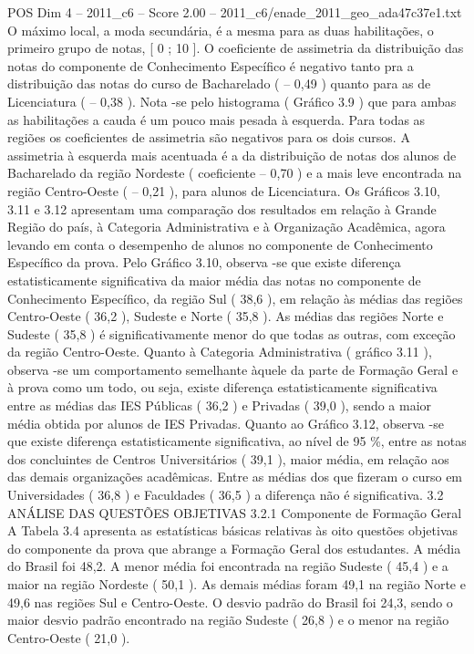 \begin{textsample}{POS Dim 4 – 2011\_c6 – Score 2.00 – 2011\_c6/enade\_2011\_geo\_ada47c37e1.txt}
O máximo local, a moda secundária, é a mesma para as duas habilitações, o primeiro grupo de notas, [ 0 ; 10 ].
O coeficiente de assimetria da distribuição das notas do componente de Conhecimento Específico é negativo tanto pra a distribuição das notas do curso de Bacharelado ( – 0,49 ) quanto para as de Licenciatura ( – 0,38 ).
Nota -se pelo histograma ( Gráfico 3.9 ) que para ambas as habilitações a cauda é um pouco mais pesada à esquerda.
Para todas as regiões os coeficientes de assimetria são negativos para os dois cursos.
A assimetria à esquerda mais acentuada é a da distribuição de notas dos alunos de Bacharelado da região Nordeste ( coeficiente – 0,70 ) e a mais leve encontrada na região Centro-Oeste ( – 0,21 ), para alunos de Licenciatura.
Os Gráficos 3.10, 3.11 e 3.12 apresentam uma comparação dos resultados em relação à Grande Região do país, à Categoria Administrativa e à Organização Acadêmica, agora levando em conta o desempenho de alunos no componente de Conhecimento Específico da prova.
Pelo Gráfico 3.10, observa -se que existe diferença estatisticamente significativa da maior média das notas no componente de Conhecimento Específico, da região Sul ( 38,6 ), em relação às médias das regiões Centro-Oeste ( 36,2 ), Sudeste e Norte ( 35,8 ).
As médias das regiões Norte e Sudeste ( 35,8 ) é significativamente menor do que todas as outras, com exceção da região Centro-Oeste.
Quanto à Categoria Administrativa ( gráfico 3.11 ), observa -se um comportamento semelhante àquele da parte de Formação Geral e à prova como um todo, ou seja, existe diferença estatisticamente significativa entre as médias das IES Públicas ( 36,2 ) e Privadas ( 39,0 ), sendo a maior média obtida por alunos de IES Privadas.
Quanto ao Gráfico 3.12, observa -se que existe diferença estatisticamente significativa, ao nível de 95 \%, entre as notas dos concluintes de Centros Universitários ( 39,1 ), maior média, em relação aos das demais organizações acadêmicas.
Entre as médias dos que fizeram o curso em Universidades ( 36,8 ) e Faculdades ( 36,5 ) a diferença não é significativa. 3.2 ANÁLISE DAS QUESTÕES OBJETIVAS 3.2.1 Componente de Formação Geral A Tabela 3.4 apresenta as estatísticas básicas relativas às oito questões objetivas do componente da prova que abrange a Formação Geral dos estudantes.
A média do Brasil foi 48,2.
A menor média foi encontrada na região Sudeste ( 45,4 ) e a maior na região Nordeste ( 50,1 ).
As demais médias foram 49,1 na região Norte e 49,6 nas regiões Sul e Centro-Oeste.
O desvio padrão do Brasil foi 24,3, sendo o maior desvio padrão encontrado na região Sudeste ( 26,8 ) e o menor na região Centro-Oeste ( 21,0 ).

\end{textsample}
